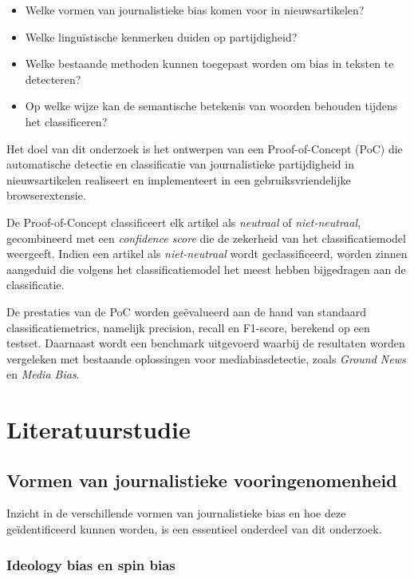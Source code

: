 \begin{itemize}
    \item Welke vormen van journalistieke bias komen voor in nieuwsartikelen?
    \item Welke linguïstische kenmerken duiden op partijdigheid?
    \item Welke bestaande methoden kunnen toegepast worden om bias in teksten te detecteren?
    \item Op welke wijze kan de semantische betekenis van woorden behouden tijdens het classificeren?
\end{itemize}

Het doel van dit onderzoek is het ontwerpen van een Proof-of-Concept (PoC) die automatische detectie en classificatie van journalistieke partijdigheid in nieuwsartikelen realiseert en implementeert in een gebruiksvriendelijke browserextensie.

De Proof-of-Concept classificeert elk artikel als \textit{neutraal} of \textit{niet-neutraal}, gecombineerd met een \textit{confidence score} die de zekerheid van het classificatiemodel weergeeft. Indien een artikel als \textit{niet-neutraal} wordt geclassificeerd, worden zinnen aangeduid die volgens het classificatiemodel het meest hebben bijgedragen aan de classificatie.

De prestaties van de PoC worden geëvalueerd aan de hand van standaard classificatiemetrics, namelijk precision, recall en F1-score, berekend op een testset. Daarnaast wordt een benchmark uitgevoerd waarbij de resultaten worden vergeleken met bestaande oplossingen voor mediabiasdetectie, zoals \textit{Ground News} en \textit{Media Bias}.

\section{Literatuurstudie}
\label{sec:literatuurstudie}

\subsection{Vormen van journalistieke vooringenomenheid}

Inzicht in de verschillende vormen van journalistieke bias en hoe deze geïdentificeerd kunnen worden, is een essentieel onderdeel van dit onderzoek.

\subsubsection{Ideology bias en spin bias}

